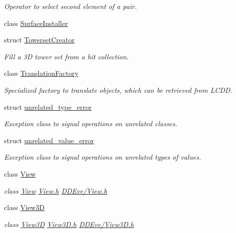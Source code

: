 \begin{DoxyCompactItemize}
\begin{DoxyCompactList}\small\item\em Operator to select second element of a pair. \end{DoxyCompactList}\item 
class \hyperlink{class_d_d4hep_1_1_surface_installer}{Surface\+Installer}
\item 
struct \hyperlink{struct_d_d4hep_1_1_towerset_creator}{Towerset\+Creator}
\begin{DoxyCompactList}\small\item\em Fill a 3D tower set from a hit collection. \end{DoxyCompactList}\item 
class \hyperlink{class_d_d4hep_1_1_translation_factory}{Translation\+Factory}
\begin{DoxyCompactList}\small\item\em Specialized factory to translate objects, which can be retrieved from L\+C\+DD. \end{DoxyCompactList}\item 
struct \hyperlink{struct_d_d4hep_1_1unrelated__type__error}{unrelated\+\_\+type\+\_\+error}
\begin{DoxyCompactList}\small\item\em Exception class to signal operations on unrelated classes. \end{DoxyCompactList}\item 
struct \hyperlink{struct_d_d4hep_1_1unrelated__value__error}{unrelated\+\_\+value\+\_\+error}
\begin{DoxyCompactList}\small\item\em Exception class to signal operations on unrelated types of values. \end{DoxyCompactList}\item 
class \hyperlink{class_d_d4hep_1_1_view}{View}
\begin{DoxyCompactList}\small\item\em class \hyperlink{class_d_d4hep_1_1_view}{View} \hyperlink{_view_8h}{View.\+h} \hyperlink{_view_8h}{D\+D\+Eve/\+View.\+h} \end{DoxyCompactList}\item 
class \hyperlink{class_d_d4hep_1_1_view3_d}{View3D}
\begin{DoxyCompactList}\small\item\em class \hyperlink{class_d_d4hep_1_1_view3_d}{View3D} \hyperlink{_view3_d_8h}{View3\+D.\+h} \hyperlink{_view3_d_8h}{D\+D\+Eve/\+View3\+D.\+h} \end{DoxyCompactList}\item 

\end{DoxyCompactItemize}
